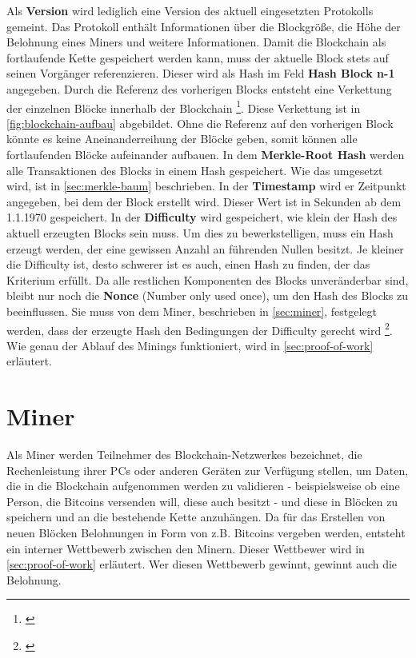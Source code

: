 Als \textbf{Version} wird lediglich eine Version des aktuell eingesetzten Protokolls gemeint. Das Protokoll enthält Informationen über die Blockgröße, die Höhe der Belohnung eines Miners und weitere Informationen.
Damit die Blockchain als fortlaufende Kette gespeichert werden kann, muss der aktuelle Block stets auf seinen Vorgänger referenzieren. Dieser wird als Hash im Feld \textbf{Hash Block n-1} angegeben. Durch die Referenz des vorherigen Blocks entsteht eine Verkettung der einzelnen Blöcke innerhalb der Blockchain \footnote{\parencite[vgl.][S. 137]{Bruhl.2017}}. Diese Verkettung ist in \vref*{fig:blockchain-aufbau} abgebildet. Ohne die Referenz auf den vorherigen Block könnte es keine Aneinanderreihung der Blöcke geben, somit können alle fortlaufenden Blöcke aufeinander aufbauen.
In dem \textbf{Merkle-Root Hash} werden alle Transaktionen des Blocks in einem Hash gespeichert. Wie das umgesetzt wird, ist in \vref*{sec:merkle-baum} beschrieben. In der \textbf{Timestamp} wird er Zeitpunkt angegeben, bei dem der Block erstellt wird. Dieser Wert ist in Sekunden ab dem 1.1.1970 gespeichert.
In der \textbf{Difficulty} wird gespeichert, wie klein der Hash des aktuell erzeugten Blocks sein muss. Um dies zu bewerkstelligen, muss ein Hash erzeugt werden, der eine gewissen Anzahl an führenden Nullen besitzt. Je kleiner die Difficulty ist, desto schwerer ist es auch, einen Hash zu finden, der das Kriterium erfüllt. 
Da alle restlichen Komponenten des Blocks unveränderbar sind, bleibt nur noch die \textbf{Nonce} (Number only used once), um den Hash des Blocks zu beeinflussen. Sie muss von dem Miner, beschrieben in \vref*{sec:miner}, festgelegt werden, dass der erzeugte Hash den Bedingungen der Difficulty gerecht wird \footnote{\parencite[vgl.][]{Vidrih.29.12.2018}}. Wie genau der Ablauf des Minings funktioniert, wird in \vref{sec:proof-of-work} erläutert.



\section{Miner}\label{sec:miner}
Als Miner werden Teilnehmer des Blockchain-Netzwerkes bezeichnet, die Rechenleistung ihrer PCs oder anderen Geräten zur Verfügung stellen, um Daten, die in die Blockchain aufgenommen werden zu validieren - beispielsweise ob eine Person, die Bitcoins versenden will, diese auch besitzt - und diese in Blöcken zu speichern und an die bestehende Kette anzuhängen. Da für das Erstellen von neuen Blöcken Belohnungen in Form von z.B. Bitcoins vergeben werden, entsteht ein interner Wettbewerb zwischen den Minern. Dieser Wettbewer wird in \vref*{sec:proof-of-work} erläutert. Wer diesen Wettbewerb gewinnt, gewinnt auch die Belohnung.

